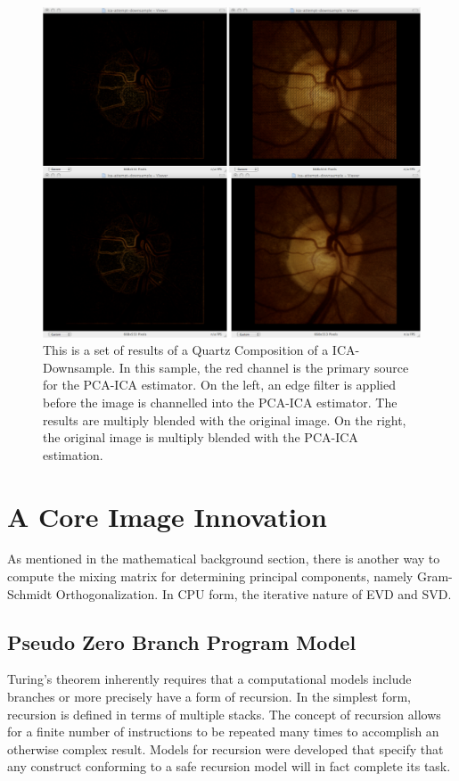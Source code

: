 \documentclass[11pt]{article}
\begin{document}
\begin{figure}[htbp] %
   \centering
   \includegraphics[width=6in]{ica-downsample-eye.pdf} 
   \caption{This is a set of results of a Quartz Composition of a ICA-Downsample.  In this sample, the red channel is the primary source for the PCA-ICA estimator.  On the left, an edge filter is applied before the image is channelled %
into the PCA-ICA estimator.  The results are multiply blended with the original image.  On the right, the original image is multiply blended with the PCA-ICA estimation. }
   \label{downsampled-ica-quartz-composer-red-channel}
\end{figure}




\section{A Core Image Innovation}
As mentioned in the mathematical background section, there is another way to compute the mixing matrix for determining principal components, namely Gram-Schmidt Orthogonalization.  In CPU form, the iterative nature of EVD and SVD.

\subsection{Pseudo Zero Branch Program Model}
Turing's theorem inherently requires that a computational models include branches or more precisely have a form of recursion.  In the simplest form, recursion is defined in terms of multiple stacks.  The concept of recursion allows for a finite number of instructions to be repeated many times to accomplish an otherwise complex result.  Models for recursion were developed that specify that any construct conforming to a safe recursion model will in fact complete its task.
\end{document}
